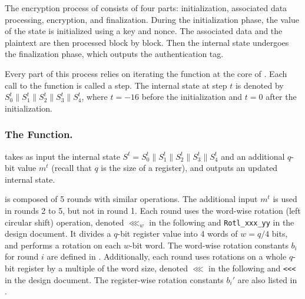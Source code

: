 The encryption process of \MORUS consists of four parts: initialization, associated data processing, encryption, and finalization. 
During the initialization phase, the value of the state is initialized using a key and nonce.
The associated data and the plaintext are then processed block by block.
Then the internal state undergoes the finalization phase, which outputs the authentication tag.

Every part of this process relies on iterating the \StateUpdate{} function at the core of \MORUS. Each call to the \StateUpdate{} function is called a step.
The internal state at step $t$ is denoted by $S^t_0\|S^t_1\|S^t_2\|S^t_3\|S^t_4$, where $t = -16$ before the initialization and $t=0$ after the initialization.


\subsubsection{The \StateUpdate{} Function.}
\StateUpdate{} takes as input the internal state $S^t = S^t_0\|S^t_1\|S^t_2\|S^t_3\|S^t_4$ and an additional $q$-bit value $m^t$ (recall that $q$ is the size of a register), and outputs an updated internal state.

\StateUpdate{} is composed of 5 rounds with similar operations.
The additional input $m^t$ is used in rounds 2 to 5, but not in round 1.
Each round uses the word-wise rotation (left circular shift) operation,
denoted $\lll_w$ in the following and \texttt{Rotl\_xxx\_yy} in the design document.
It divides a $q$-bit register value into 4 words of $w = q/4$ bits, and performs a rotation on each $w$-bit word.
The word-wise rotation constants $b_i$ for round $i$ are defined in .
Additionally, each round uses rotations on a whole $q$-bit register by a multiple of the word size,
denoted $\lll$ in the following and \texttt{<<<} in the design document.
The register-wise rotation constants $b_i'$ are also listed in .

